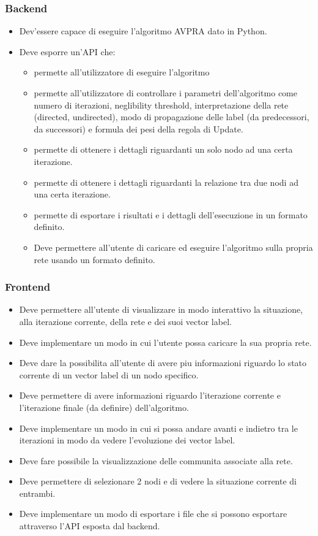 \documentclass[a4paper,12pt]{report}
\begin{document}
			\subsubsection{Backend}
			\begin{itemize}
				\item Dev'essere capace di eseguire l'algoritmo AVPRA dato in Python.
				\item Deve esporre un'API che:
				\begin{itemize}
					\item permette all'utilizzatore di eseguire l'algoritmo
					\item permette all'utilizzatore di controllare i parametri dell'algoritmo come numero di iterazioni, neglibility threshold, interpretazione della rete (directed, undirected), modo di propagazione delle label (da predecessori, da successori) e formula dei pesi della regola di Update.
					\item permette di ottenere i dettagli riguardanti un solo nodo ad una certa iterazione.
					\item permette di ottenere i dettagli riguardanti la relazione tra due nodi ad una certa iterazione.
					\item permette di esportare i risultati e i dettagli dell'esecuzione in un formato definito.
					\item Deve permettere all'utente di caricare ed eseguire l'algoritmo sulla propria rete usando un formato definito.
				\end{itemize}
			\end{itemize}

			\subsubsection{Frontend}
				\begin{itemize}
					\item Deve permettere all'utente di visualizzare in modo interattivo la situazione, alla iterazione corrente, della rete e dei suoi vector label.
					\item Deve implementare un modo in cui l'utente possa caricare la sua propria rete.
					\item Deve dare la possibilita all'utente di avere piu informazioni riguardo lo stato corrente di un vector label di un nodo specifico.
					\item Deve permettere di avere informazioni riguardo l'iterazione corrente e l'iterazione finale (da definire) dell'algoritmo.
					\item Deve implementare un modo in cui si possa andare avanti e indietro tra le iterazioni in modo da vedere l'evoluzione dei vector label.
					\item Deve fare possibile la visualizzazione delle communita associate alla rete.
					\item Deve permettere di selezionare 2 nodi e di vedere la situazione corrente di entrambi.
					\item Deve implementare un modo di esportare i file che si possono esportare attraverso l'API esposta dal backend.
				\end{itemize}
\end{document}
